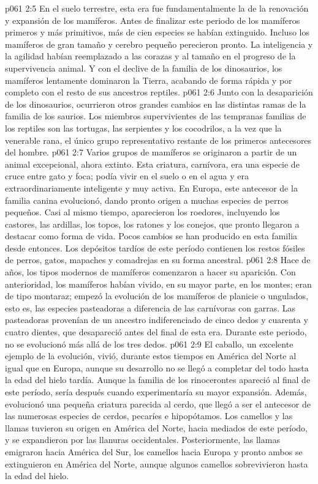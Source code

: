 \vs p061 2:5 En el suelo terrestre, esta era fue fundamentalmente la de la renovación y expansión de los mamíferos. Antes de finalizar este periodo de los mamíferos primeros y más primitivos, más de cien especies se habían extinguido. Incluso los mamíferos de gran tamaño y cerebro pequeño perecieron pronto. La inteligencia y la agilidad habían reemplazado a las corazas y al tamaño en el progreso de la supervivencia animal. Y con el declive de la familia de los dinosaurios, los mamíferos lentamente dominaron la Tierra, acabando de forma rápida y por completo con el resto de sus ancestros reptiles.
\vs p061 2:6 Junto con la desaparición de los dinosaurios, ocurrieron otros grandes cambios en las distintas ramas de la familia de los saurios. Los miembros supervivientes de las tempranas familias de los reptiles son las tortugas, las serpientes y los cocodrilos, a la vez que la venerable rana, el único grupo representativo restante de los primeros antecesores del hombre.
\vs p061 2:7 Varios grupos de mamíferos se originaron a partir de un animal excepcional, ahora extinto. Esta criatura, carnívora, era una especie de cruce entre gato y foca; podía vivir en el suelo o en el agua y era extraordinariamente inteligente y muy activa. En Europa, este antecesor de la familia canina evolucionó, dando pronto origen a muchas especies de perros pequeños. Casi al mismo tiempo, aparecieron los roedores, incluyendo los castores, las ardillas, los topos, los ratones y los conejos, que pronto llegaron a destacar como forma de vida. Pocos cambios se han producido en esta familia desde entonces. Los depósitos tardíos de este período contienen los restos fósiles de perros, gatos, mapaches y comadrejas en su forma ancestral.
\vs p061 2:8 \pc Hace  de años, los tipos modernos de mamíferos comenzaron a hacer su aparición. Con anterioridad, los mamíferos habían vivido, en su mayor parte, en los montes; eran de tipo montaraz;  empezó la evolución de los mamíferos de planicie o ungulados, esto es, las especies pasteadoras a diferencia de las carnívoras con garras. Las pasteadoras provenían de un ancestro indiferenciado de cinco dedos y cuarenta y cuatro dientes, que desapareció antes del final de esta era. Durante este periodo, no se evolucionó más allá de los tres dedos.
\vs p061 2:9 El caballo, un excelente ejemplo de la evolución, vivió, durante estos tiempos en América del Norte al igual que en Europa, aunque su desarrollo no se llegó a completar del todo hasta la edad del hielo tardía. Aunque la familia de los rinocerontes apareció al final de este período, sería después cuando experimentaría su mayor expansión. Además, evolucionó una pequeña criatura parecida al cerdo, que llegó a ser el antecesor de las numerosas especies de cerdos, pecaríes e hipopótamos. Los camellos y las llamas tuvieron su origen en América del Norte, hacia mediados de este período, y se expandieron por las llanuras occidentales. Posteriormente, las llamas emigraron hacia América del Sur, los camellos hacia Europa y pronto ambos se extinguieron en América del Norte, aunque algunos camellos sobrevivieron hasta la edad del hielo.
